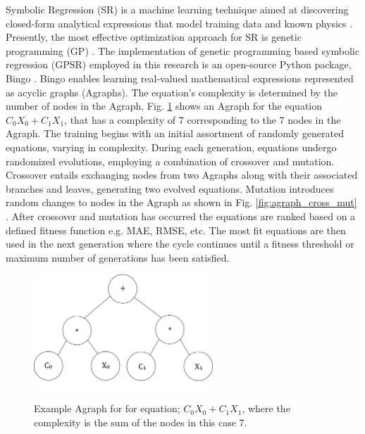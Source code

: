 Symbolic Regression (SR) is a machine learning technique aimed at discovering closed-form analytical expressions that model training data and known physics \cite{Karl,  Hongsup}. Presently, the most effective optimization approach for SR is genetic programming (GP) \cite{GPSR-comp}. The implementation of genetic programming based symbolic regression (GPSR) employed in this research is an open-source Python package, Bingo \cite{Randall2022}. Bingo enables learning real-valued mathematical expressions represented as acyclic graphs (Agraphs). The equation's complexity is determined by the number of nodes in the Agraph, Fig. \ref{fig:agraph} shows an Agraph for the equation $C_0 X_0 + C_1 X_1$, that has a complexity of 7 corresponding to the 7 nodes in the Agraph. The training begins with an initial assortment of randomly generated equations, varying in complexity. During each generation, equations undergo randomized evolutions, employing a combination of crossover and mutation. Crossover entails exchanging nodes from two Agraphs along with their associated branches and leaves, generating two evolved equations. Mutation introduces random changes to nodes in the Agraph as shown in Fig. \ref{fig:agraph_cross_mut} \cite{Schmidt2007}. After crossover and mutation has occurred the equations are ranked based on a defined fitness function e.g. MAE, RMSE, etc. The most fit equations are then used in the next generation where the cycle continues until a fitness threshold or maximum number of generations has been satisfied. 

\begin{figure}
    \centering
    \includegraphics[width=0.6\textwidth]{geometry_figures/agraph.png}
    \label{fig:agraph}
    \caption{Example Agraph for for equation; $C_0 X_0 + C_1 X_1$, where the complexity is the sum of the nodes in this case 7.} 
\end{figure}


